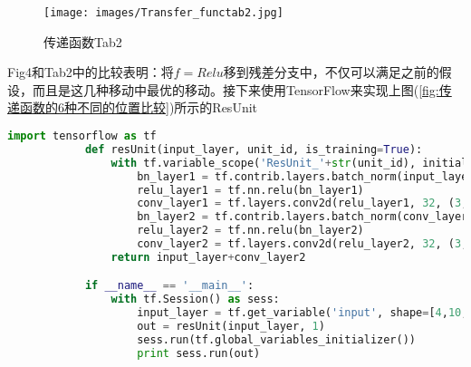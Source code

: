            \begin{figure}[H]
            \centering
            \texttt{[image: images/Transfer\_functab2.jpg]}
            \caption{传递函数Tab2}
            \label{fig:传递函数Tab2}
            \end{figure}
            Fig4和Tab2中的比较表明：将$f=Relu$移到残差分支中，不仅可以满足之前的假设，而且是这几种移动中最优的移动。接下来使用TensorFlow来实现上图(\ref{fig:传递函数的6种不同的位置比较})所示的ResUnit
            \begin{lstlisting}[language = Python]
            import tensorflow as tf
            def resUnit(input_layer, unit_id, is_training=True):
                with tf.variable_scope('ResUnit_'+str(unit_id), initializer=tf.random_normal_initializer()):
                    bn_layer1 = tf.contrib.layers.batch_norm(input_layer, is_training=is_training)
                    relu_layer1 = tf.nn.relu(bn_layer1)
                    conv_layer1 = tf.layers.conv2d(relu_layer1, 32, (3,3), padding='same')
                    bn_layer2 = tf.contrib.layers.batch_norm(conv_layer1, is_training=is_training)
                    relu_layer2 = tf.nn.relu(bn_layer2)
                    conv_layer2 = tf.layers.conv2d(relu_layer2, 32, (3,3), padding='same')
                return input_layer+conv_layer2

            if __name__ == '__main__':
                with tf.Session() as sess:
                    input_layer = tf.get_variable('input', shape=[4,10,10,32], dtype=tf.float32)
                    out = resUnit(input_layer, 1)
                    sess.run(tf.global_variables_initializer())
                    print sess.run(out)
            \end{lstlisting}

